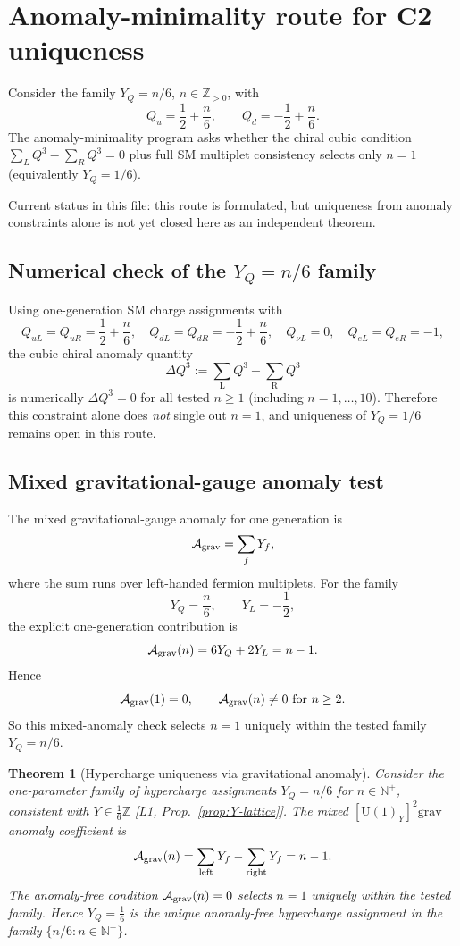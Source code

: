 \documentclass[12pt,a4paper]{article}
\newtheorem{theorem}{Theorem}[section]
\theoremstyle{remark}
\newcommand{\ZZ}{\mathbb{Z}}
\begin{document}
\section{Anomaly-minimality route for C2 uniqueness}
Consider the family \(Y_Q=n/6\), \(n\in\ZZ_{>0}\), with
\[
Q_u=\frac12+\frac{n}{6},\qquad Q_d=-\frac12+\frac{n}{6}.
\]
The anomaly-minimality program asks whether the chiral cubic condition
\(\sum_L Q^3-\sum_R Q^3=0\) plus full SM multiplet consistency selects only
\(n=1\) (equivalently \(Y_Q=1/6\)).

Current status in this file: this route is formulated, but uniqueness from
anomaly constraints alone is not yet closed here as an independent theorem.

\subsection*{Numerical check of the \(Y_Q=n/6\) family}
Using one-generation SM charge assignments with
\[
Q_{uL}=Q_{uR}=\frac12+\frac{n}{6},\quad
Q_{dL}=Q_{dR}=-\frac12+\frac{n}{6},\quad
Q_{\nu L}=0,\quad Q_{eL}=Q_{eR}=-1,
\]
the cubic chiral anomaly quantity
\[
\Delta Q^3:=\sum_{\mathrm L}Q^3-\sum_{\mathrm R}Q^3
\]
is numerically \(\Delta Q^3=0\) for all tested \(n\ge 1\) (including
\(n=1,\dots,10\)). Therefore this constraint alone does \emph{not}
single out \(n=1\), and uniqueness of \(Y_Q=1/6\) remains open in this route.

\subsection*{Mixed gravitational-gauge anomaly test}

The mixed gravitational-gauge anomaly for one generation is
\[
\mathcal A_{\rm grav}=\sum_f Y_f,
\]
where the sum runs over left-handed fermion multiplets.  For the family
\[
Y_Q=\frac{n}{6},\qquad Y_L=-\frac12,
\]
the explicit one-generation contribution is
\[
\mathcal A_{\rm grav}(n)=6Y_Q+2Y_L=n-1.
\]
Hence
\[
\mathcal A_{\rm grav}(1)=0,\qquad
\mathcal A_{\rm grav}(n)\neq 0 \ \text{for}\ n\ge 2.
\]
So this mixed-anomaly check selects \(n=1\) uniquely within the tested
family \(Y_Q=n/6\).

\begin{theorem}[Hypercharge uniqueness via gravitational anomaly]
\label{thm:C2-uniqueness}
Consider the one-parameter family of hypercharge assignments
$Y_Q = n/6$ for $n \in \mathbb{N}^+$, consistent with
$Y \in \tfrac{1}{6}\mathbb{Z}$ [L1, Prop.~\ref{prop:Y-lattice}].
The mixed $[\mathrm{U}(1)_Y]^2 \mathrm{grav}$ anomaly coefficient is
\[
  \mathcal{A}_{\rm grav}(n)
  = \sum_{\rm left} Y_f - \sum_{\rm right} Y_f = n - 1.
\]
The anomaly-free condition $\mathcal{A}_{\rm grav}(n) = 0$
selects $n = 1$ uniquely within the tested family.
Hence $Y_Q = \tfrac{1}{6}$ is the unique anomaly-free hypercharge
assignment in the family $\{n/6 : n \in \mathbb{N}^+\}$.
\end{theorem}
\end{document}
